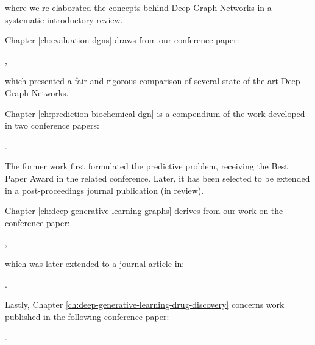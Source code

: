 \noindent where we re-elaborated the concepts behind Deep Graph Networks in a systematic introductory review.

\noindent Chapter \ref{ch:evaluation-dgns} draws from our conference paper:

\vspace{1em}
,
\vspace{1em}

\noindent which presented a fair and rigorous comparison of several state of the art Deep Graph Networks.

\noindent Chapter \ref{ch:prediction-biochemical-dgn} is a compendium of the work developed in two conference papers:

\vspace{1em}

.
\vspace{1em}

\noindent The former work first formulated the predictive problem, receiving the Best Paper Award in the related conference. Later, it has been selected to be extended in a post-proceedings journal publication (in review).

\noindent Chapter \ref{ch:deep-generative-learning-graphs} derives from our work on the conference paper:

\vspace{1em}
,
\vspace{1em}

\noindent which was later extended to a journal article in:

\vspace{1em}
.
\vspace{1em}

\noindent Lastly, Chapter \ref{ch:deep-generative-learning-drug-discovery} concerns work published in the following conference paper:

\vspace{1em}
.
\vspace{1em}